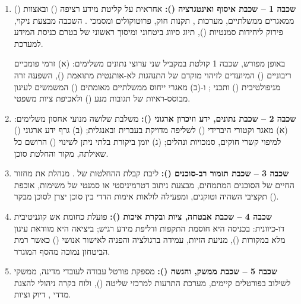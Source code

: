 \begin{enumerate}[leftmargin=1.8em]
  \item \textbf{שכבה 1 -- שכבת איסוף ואינטגרציה ():}
  אחראית על קליטת מידע רציפה () ובאצוות () ממאגרים ממשלתיים, מערכות , תקנות חוק, פרוטוקולים ומסמכי . השכבה מבצעת ניקוי, פירוק ליחידות סמנטיות (), תיוג סיווג ביטחוני ומיסוך ראשוני של  בטרם כניסת המידע למערכת.

  באופן מפורש, שכבה 1 קולטת במקביל שני ערוצי נתונים משלימים: (א) זרמי  פומביים ריבוניים () המיועדים לזיהוי מוקדם של התנהגות לא-אותנטית מתואמת (), השפעה זרה מניפולטיבית () ותכני ; ו-(ב) מאגרי ייחוס ממשלתיים מאומתים () המשמשים לעיגון מבוסס-ראיות של תגובות מנע () ולאכיפת ציות משפטי.

  \item \textbf{שכבה 2 -- שכבת נתונים, ידע וזיכרון ארגוני ():}
  משלבת שלושה מנועי אחסון משלימים: (א) מאגר וקטורי היברידי () לשליפה מדויקת בעברית ובאנגלית; (ב) גרף ידע ארגוני () למיפוי קשרי חוקים, סמכויות ונהלים; (ג) יומן ביקורת בלתי ניתן לשינוי () הרושם כל שאילתה, מקור והחלטת סוכן.

  \item \textbf{שכבה 3 -- שכבת תזמור רב-סוכנים ():}
  ליבת קבלת ההחלטות של . מנהלת את מחזור החיים של הסוכנים המתמחים, מבצעת ניתוב דטרמיניסטי או סמנטי של משימות, אוכפת תקציבי השהיה וטוקנים, ומפעילה לולאות אימות הדדי בין סוכן יצרן לסוכן מבקר ().

  \item \textbf{שכבה 4 -- שכבת אבטחה, ציות ובקרת איכות ():}
  פועלת כחומת אש קוגניטיבית דו-כיוונית: בכניסה היא חוסמת התקפות  ודליפת מידע רגיש; ביציאה היא מוודאת עיגון מלא במקורות (), מניעת הזיות, עמידה ברגולציה והפניה לאישור אנושי () כאשר רמת הביטחון נמוכה מהסף המוגדר.

  \item \textbf{שכבה 5 -- שכבת ממשק,  והגשה ():}
  מספקת פורטל עבודה לעובדי מדינה, ממשקי  לשילוב בפורטלים קיימים, מערכת התרעות למרכזי שליטה (), ולוח בקרה ניהולי להצגת מדדי , דיוק וציות.
\end{enumerate}

